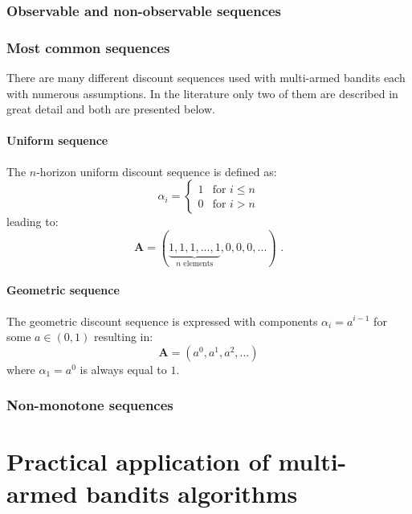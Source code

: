 \documentclass[12pt, a4paper, pdflatex]{report}
\begin{document}
\subsection{Observable and non-observable sequences}
\lipsum[1]

\subsection{Most common sequences}
There are many different discount sequences used with multi-armed bandits each with numerous assumptions. In the literature only two of them are described in great detail and both are presented below.
\subsubsection{Uniform sequence}
The $n$-horizon uniform discount sequence is defined as:
\[
 \alpha_i =
  \begin{cases}
   1 & \text{for } i \leq n \\
   0 & \text{for } i > n
  \end{cases}
\]
leading to:
\[
  \mathbf{A} = ( \underbrace{ 1, 1, 1, ..., 1}_{n\text{ elements}}, 0, 0, 0, ... ) \text{ .}
\]
\subsubsection{Geometric sequence}
The geometric discount sequence is expressed with components $\alpha_i = a^{i-1}$ for some $a \in ( 0, 1 )$ resulting in:
$$
\mathbf{A} = \left( a^0, a^1, a^2, ... \right)
$$
where $\alpha_1 = a^0$ is always equal to $1$.

\subsection{Non-monotone sequences}









\chapter{Practical application of multi-armed bandits algorithms}

{}

\end{document}

